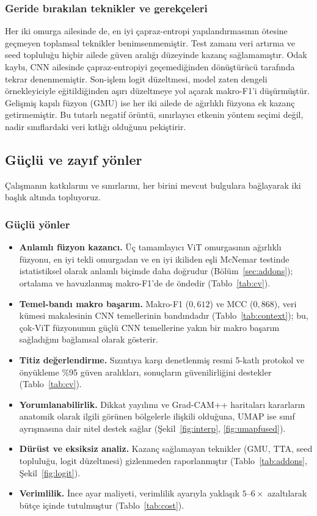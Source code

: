 \subsubsection{Geride bırakılan teknikler ve gerekçeleri}
Her iki omurga ailesinde de, en iyi çapraz-entropi yapılandırmasının ötesine
geçmeyen toplamsal teknikler benimsenmemiştir. Test zamanı veri artırma ve seed
topluluğu hiçbir ailede güven aralığı düzeyinde kazanç sağlamamıştır. Odak kaybı, CNN
ailesinde çapraz-entropiyi geçemediğinden dönüştürücü tarafında tekrar denenmemiştir.
Son-işlem logit düzeltmesi, model zaten dengeli örnekleyiciyle eğitildiğinden aşırı
düzeltmeye yol açarak makro-F1'i düşürmüştür. Gelişmiş kapılı füzyon (GMU) ise her iki
ailede de ağırlıklı füzyona ek kazanç getirmemiştir. Bu tutarlı negatif örüntü,
sınırlayıcı etkenin yöntem seçimi değil, nadir sınıflardaki veri kıtlığı olduğunu
pekiştirir.

\subsection{Güçlü ve zayıf yönler}
Çalışmanın katkılarını ve sınırlarını, her birini mevcut bulgulara bağlayarak iki
başlık altında topluyoruz.

\subsubsection{Güçlü yönler}
\begin{itemize}
  \item \textbf{Anlamlı füzyon kazancı.} Üç tamamlayıcı ViT omurgasının ağırlıklı
        füzyonu, en iyi tekli omurgadan ve en iyi ikiliden eşli McNemar testinde
        istatistiksel olarak anlamlı biçimde daha doğrudur (Bölüm~\ref{sec:addons});
        ortalama ve havuzlanmış makro-F1'de de öndedir (Tablo~\ref{tab:cv}).
  \item \textbf{Temel-bandı makro başarım.} Makro-F1 ($0{,}612$) ve MCC ($0{,}868$),
        veri kümesi makalesinin CNN temellerinin bandındadır (Tablo~\ref{tab:context});
        bu, çok-ViT füzyonunun güçlü CNN temellerine yakın bir makro başarım sağladığını
        bağlamsal olarak gösterir.
  \item \textbf{Titiz değerlendirme.} Sızıntıya karşı denetlenmiş resmi 5-katlı
        protokol ve önyükleme \%95 güven aralıkları, sonuçların güvenilirliğini
        destekler (Tablo~\ref{tab:cv}).
  \item \textbf{Yorumlanabilirlik.} Dikkat yayılımı ve Grad-CAM++ haritaları
        kararların anatomik olarak ilgili görünen bölgelerle ilişkili olduğuna,
        UMAP ise sınıf ayrışmasına dair nitel destek sağlar
        (Şekil~\ref{fig:interp}, \ref{fig:umapfused}).
  \item \textbf{Dürüst ve eksiksiz analiz.} Kazanç sağlamayan teknikler (GMU, TTA,
        seed topluluğu, logit düzeltmesi) gizlenmeden raporlanmıştır
        (Tablo~\ref{tab:addons}, Şekil~\ref{fig:logit}).
  \item \textbf{Verimlilik.} İnce ayar maliyeti, verimlilik ayarıyla yaklaşık
        $5$--$6\times$ azaltılarak bütçe içinde tutulmuştur (Tablo~\ref{tab:cost}).
\end{itemize}

